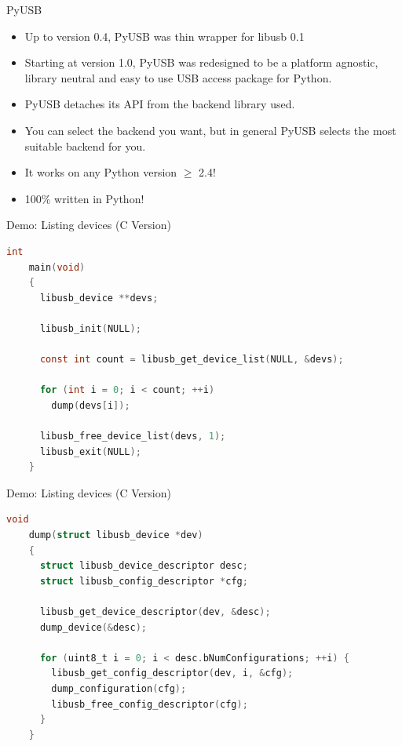 \documentclass[pdf]{beamer}
\begin{document}
\begin{frame}{PyUSB}
  \begin{itemize}
    \item Up to version 0.4, PyUSB was thin wrapper for libusb 0.1
    \item Starting at version 1.0, PyUSB was redesigned to be a
      platform agnostic, library neutral and easy to use USB access
      package for Python.
    \item PyUSB detaches its API from the backend library used.
    \item You can select the backend you want, but in general PyUSB
      selects the most suitable backend for you.
    \item It works on any Python version $\ge$ 2.4!
    \item 100\% written in Python!
  \end{itemize}
\end{frame}

\begin{frame}[fragile]{Demo:  Listing devices (C Version)}
  \tiny
  \pause
  \begin{lstlisting}[language=C]
    int
    main(void)
    {
      libusb_device **devs;

      libusb_init(NULL);

      const int count = libusb_get_device_list(NULL, &devs);

      for (int i = 0; i < count; ++i)
        dump(devs[i]);

      libusb_free_device_list(devs, 1);
      libusb_exit(NULL);
    }
  \end{lstlisting}
\end{frame}

\begin{frame}[fragile]{Demo:  Listing devices (C Version)}
  \tiny
  \begin{lstlisting}[language=C]
    void
    dump(struct libusb_device *dev)
    {
      struct libusb_device_descriptor desc;
      struct libusb_config_descriptor *cfg;

      libusb_get_device_descriptor(dev, &desc);
      dump_device(&desc);

      for (uint8_t i = 0; i < desc.bNumConfigurations; ++i) {
        libusb_get_config_descriptor(dev, i, &cfg);
        dump_configuration(cfg);
        libusb_free_config_descriptor(cfg);
      }
    }
  \end{lstlisting}
\end{frame}
\end{document}

